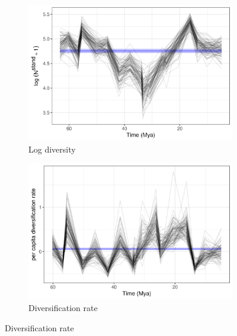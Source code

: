 \documentclass[12pt,letterpaper]{article}
\begin{document}
\begin{figure}[ht]
  \begin{subfigure}[b]{0.45\textwidth}
    \includegraphics[width=\textwidth,height=0.4\textheight,keepaspectratio=true]{figure/log_diversity}
    \caption{Log diversity}
    \label{fig:diversity_est}
  \end{subfigure}
  \begin{subfigure}[b]{0.45\textwidth}
    \includegraphics[width=\textwidth,height=0.4\textheight,keepaspectratio=true]{figure/div_rate}
    \caption{Diversification rate}
    \label{fig:diversity_rate}
  \end{subfigure}


\end{figure}
\end{document}
